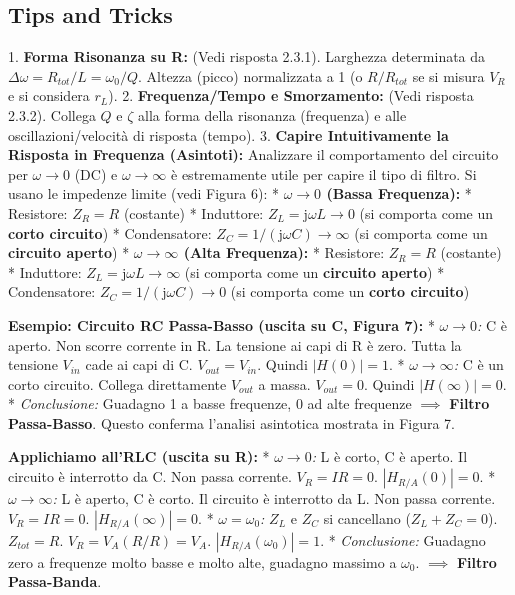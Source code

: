 \documentclass[a4paper, 11pt]{article}
\newcommand{\jj}{\mathrm{j}} %
\newcommand{\abs}[1]{\left|#1\right|}
\begin{document}
\subsection{Tips and Tricks}

1.  \textbf{Forma Risonanza su R:} (Vedi risposta 2.3.1). Larghezza determinata da $\Delta\omega = R_{tot}/L = \omega_0/Q$. Altezza (picco) normalizzata a 1 (o $R/R_{tot}$ se si misura $V_R$ e si considera $r_L$).
2.  \textbf{Frequenza/Tempo e Smorzamento:} (Vedi risposta 2.3.2). Collega $Q$ e $\zeta$ alla forma della risonanza (frequenza) e alle oscillazioni/velocità di risposta (tempo).
3.  \textbf{Capire Intuitivamente la Risposta in Frequenza (Asintoti):} Analizzare il comportamento del circuito per $\omega \to 0$ (DC) e $\omega \to \infty$ è estremamente utile per capire il tipo di filtro. Si usano le impedenze limite (vedi Figura 6):
    *   \textbf{$\omega \to 0$ (Bassa Frequenza):}
        *   Resistore: $Z_R = R$ (costante)
        *   Induttore: $Z_L = \jj \omega L \to 0$ (si comporta come un \textbf{corto circuito})
        *   Condensatore: $Z_C = 1/(\jj \omega C) \to \infty$ (si comporta come un \textbf{circuito aperto})
    *   \textbf{$\omega \to \infty$ (Alta Frequenza):}
        *   Resistore: $Z_R = R$ (costante)
        *   Induttore: $Z_L = \jj \omega L \to \infty$ (si comporta come un \textbf{circuito aperto})
        *   Condensatore: $Z_C = 1/(\jj \omega C) \to 0$ (si comporta come un \textbf{corto circuito})

    \textbf{Esempio: Circuito RC Passa-Basso (uscita su C, Figura 7):}
    *   \textit{$\omega \to 0$:} C è aperto. Non scorre corrente in R. La tensione ai capi di R è zero. Tutta la tensione $V_{in}$ cade ai capi di C. $V_{out} = V_{in}$. Quindi $\abs{H(0)} = 1$.
    *   \textit{$\omega \to \infty$:} C è un corto circuito. Collega direttamente $V_{out}$ a massa. $V_{out} = 0$. Quindi $\abs{H(\infty)} = 0$.
    *   \textit{Conclusione:} Guadagno 1 a basse frequenze, 0 ad alte frequenze $\implies$ \textbf{Filtro Passa-Basso}. Questo conferma l'analisi asintotica mostrata in Figura 7.

    \textbf{Applichiamo all'RLC (uscita su R):}
    *   \textit{$\omega \to 0$:} L è corto, C è aperto. Il circuito è interrotto da C. Non passa corrente. $V_R = I R = 0$. $\abs{H_{R/A}(0)} = 0$.
    *   \textit{$\omega \to \infty$:} L è aperto, C è corto. Il circuito è interrotto da L. Non passa corrente. $V_R = I R = 0$. $\abs{H_{R/A}(\infty)} = 0$.
    *   \textit{$\omega = \omega_0$:} $Z_L$ e $Z_C$ si cancellano ($Z_L + Z_C = 0$). $Z_{tot} = R$. $V_R = V_A (R/R) = V_A$. $\abs{H_{R/A}(\omega_0)} = 1$.
    *   \textit{Conclusione:} Guadagno zero a frequenze molto basse e molto alte, guadagno massimo a $\omega_0$. $\implies$ \textbf{Filtro Passa-Banda}.
\end{document}
